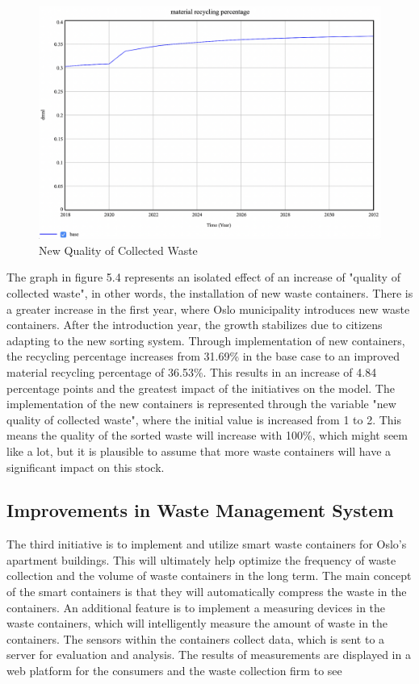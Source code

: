 \begin{figure}[H]
\centering
\includegraphics [scale=0.24,angle=360]{figures/newquality.png}
\caption{New Quality of Collected Waste}
\label{fig:newquality}
\end{figure}

\indent \newline
The graph in figure 5.4 represents an isolated effect of an increase of  "quality of collected waste", in other words, the installation of new waste containers. There is a greater increase in the first year, where Oslo municipality introduces new waste containers. After the introduction year, the growth stabilizes due to citizens adapting to the new sorting system. Through implementation of new containers, the recycling percentage increases from 31.69\% in the base case to an improved material recycling percentage of 36.53\%. This results in an increase of 4.84 percentage points and the greatest impact of the initiatives on the model. The implementation of the new containers is represented through the variable "new quality of collected waste", where the initial value is increased from 1 to 2. This means the quality of the sorted waste will increase with 100\%, which might seem like a lot, but it is plausible to assume that more waste containers will have a significant impact on this stock. 

\subsection{Improvements in Waste Management System}

\indent \newline
The third initiative is to implement and utilize smart waste containers for Oslo's apartment buildings. This will ultimately help optimize the frequency of waste collection and the volume of waste containers in the long term. The main concept of the smart containers is that they will automatically compress the waste in the containers. An additional feature is to implement a measuring devices in the waste containers, which will intelligently measure the amount of waste in the containers. The sensors within the containers collect data, which is sent to a server for evaluation and analysis. The results of measurements are displayed in a web platform for the consumers and the waste collection firm to see \cite{smart}

